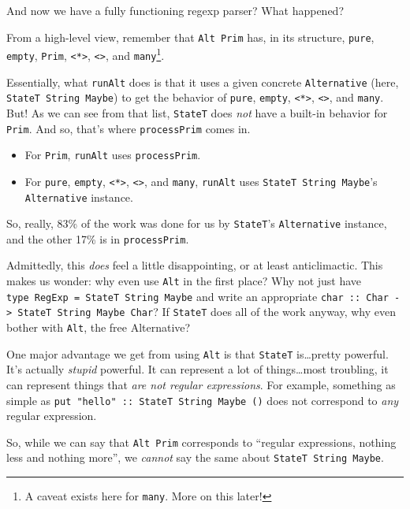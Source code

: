 \documentclass[]{article}
\begin{document}
And now we have a fully functioning regexp parser? What happened?

From a high-level view, remember that \texttt{Alt\ Prim} has, in its structure,
\texttt{pure}, \texttt{empty}, \texttt{Prim},
\texttt{\textless{}*\textgreater{}},
\texttt{\textless{}\textbar{}\textgreater{}}, and \texttt{many}\footnote{A
  caveat exists here for \texttt{many}. More on this later!}.

Essentially, what \texttt{runAlt} does is that it uses a given concrete
\texttt{Alternative} (here, \texttt{StateT\ String\ Maybe}) to get the behavior
of \texttt{pure}, \texttt{empty}, \texttt{\textless{}*\textgreater{}},
\texttt{\textless{}\textbar{}\textgreater{}}, and \texttt{many}. But! As we can
see from that list, \texttt{StateT} does \emph{not} have a built-in behavior for
\texttt{Prim}. And so, that's where \texttt{processPrim} comes in.

\begin{itemize}
\tightlist
\item
  For \texttt{Prim}, \texttt{runAlt} uses \texttt{processPrim}.
\item
  For \texttt{pure}, \texttt{empty}, \texttt{\textless{}*\textgreater{}},
  \texttt{\textless{}\textbar{}\textgreater{}}, and \texttt{many},
  \texttt{runAlt} uses \texttt{StateT\ String\ Maybe}'s \texttt{Alternative}
  instance.
\end{itemize}

So, really, 83\% of the work was done for us by \texttt{StateT}'s
\texttt{Alternative} instance, and the other 17\% is in \texttt{processPrim}.

Admittedly, this \emph{does} feel a little disappointing, or at least
anticlimactic. This makes us wonder: why even use \texttt{Alt} in the first
place? Why not just have \texttt{type\ RegExp\ =\ StateT\ String\ Maybe} and
write an appropriate
\texttt{char\ ::\ Char\ -\textgreater{}\ StateT\ String\ Maybe\ Char}? If
\texttt{StateT} does all of the work anyway, why even bother with \texttt{Alt},
the free Alternative?

One major advantage we get from using \texttt{Alt} is that \texttt{StateT}
is\ldots{}pretty powerful. It's actually \emph{stupid} powerful. It can
represent a lot of things\ldots{}most troubling, it can represent things that
\emph{are not regular expressions}. For example, something as simple as
\texttt{put\ "hello"\ ::\ StateT\ String\ Maybe\ ()} does not correspond to
\emph{any} regular expression.

So, while we can say that \texttt{Alt\ Prim} corresponds to ``regular
expressions, nothing less and nothing more'', we \emph{cannot} say the same
about \texttt{StateT\ String\ Maybe}.
\end{document}
